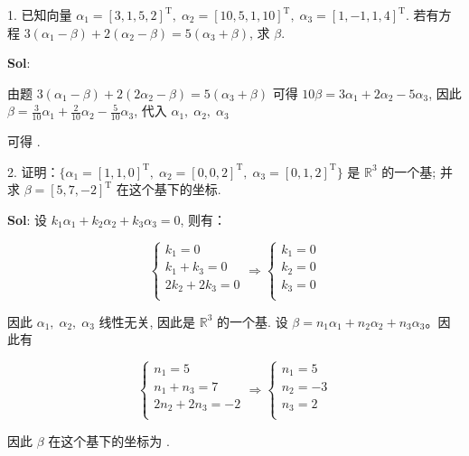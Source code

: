 
1. 已知向量 $\alpha_1=[3,1,5,2]^\text{T},\;\alpha_2=[10,5,1,10]^\text{T},\;\alpha_3=[1,-1,1,4]^\text{T}$. 若有方程 $3(\alpha_1-\beta)+2(\alpha_2-\beta)=5(\alpha_3+\beta)$, 求 $\beta$.

\textbf{Sol}: 

由题 $3(\alpha_1-\beta)+2(2\alpha_2-\beta)=5(\alpha_3+\beta)$ 
可得 $10\beta=3\alpha_1+2\alpha_2-5\alpha_3$, 
因此 $\beta=\frac{3}{10}\alpha_1+\frac{2}{10}\alpha_2-\frac{5}{10}\alpha_3$, 
代入 $\alpha_1,\;\alpha_2,\;\alpha_3$ 

可得 .

\vspace{12pt}

2. 证明：$\Big\{\alpha_1=[1,1,0]^\text{T},\;\alpha_2=[0,0,2]^\text{T},\;\alpha_3=[0,1,2]^\text{T}\Big\}$ 是 $\mathbb{R}^3$ 的一个基; 并求 $\beta=[5,7,-2]^\text{T}$ 在这个基下的坐标.

\textbf{Sol}: 设 $k_1\alpha_1+k_2\alpha_2+k_3\alpha_3=0$, 则有：

$$
\begin{cases}
k_1=0\\
k_1+k_3=0\\
2k_2+2k_3=0\\
\end{cases}
\Rightarrow 
\begin{cases}
    k_1=0\\
    k_2=0\\
    k_3=0\\
\end{cases}
$$

因此 $\alpha_1,\;\alpha_2,\;\alpha_3$ 线性无关, 因此是 $\mathbb{R}^3$ 的一个基. 设 $\beta=n_1\alpha_1+n_2\alpha_2+n_3\alpha_3$。因此有

$$
\begin{cases}
    n_1=5\\
    n_1+n_3=7\\
    2n_2+2n_3=-2\\
\end{cases}
\Rightarrow
\begin{cases}
    n_1=5\\
    n_2=-3\\
    n_3=2\\
\end{cases}
$$


因此 $\beta$ 在这个基下的坐标为 .

\vspace{12pt}

